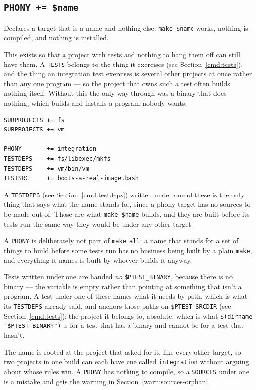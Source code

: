 \documentclass{article}
\begin{document}
\subsection{\texttt{PHONY += \$name} \label{cmd:phony}}

Declares a target that is a name and nothing else: \texttt{make
\$name} works, nothing is compiled, and nothing is installed.

This exists so that a project with tests and nothing to hang them off
can still have them.  A \texttt{TESTS} belongs to the thing it
exercises (see Section~\ref{cmd:tests}), and the thing an integration
test exercises is several other projects at once rather than any one
program --- so the project that owns such a test often builds nothing
itself.  Without this the only way through was a binary that does
nothing, which builds and installs a program nobody wants:

\begin{verbatim}
SUBPROJECTS += fs
SUBPROJECTS += vm

PHONY       += integration
TESTDEPS    += fs/libexec/mkfs
TESTDEPS    += vm/bin/vm
TESTSRC     += boots-a-real-image.bash
\end{verbatim}

A \texttt{TESTDEPS} (see Section~\ref{cmd:testdeps}) written under one
of these is the only thing that says what the name stands for, since a
phony target has no sources to be made out of.  Those are what
\texttt{make \$name} builds, and they are built before its tests run
the same way they would be under any other target.

A \texttt{PHONY} is deliberately not part of \texttt{make all}: a name
that stands for a set of things to build before some tests run has no
business being built by a plain \texttt{make}, and everything it names
is built by whoever builds it anyway.

Tests written under one are handed \textit{no}
\texttt{\$PTEST\_BINARY}, because there is no binary --- the variable
is empty rather than pointing at something that isn't a program.  A
test under one of these names what it needs by path, which is what its
\texttt{TESTDEPS} already said, and anchors those paths on
\texttt{\$PTEST\_SRCDIR} (see Section~\ref{cmd:tests}): the project
it belongs to, absolute, which is what
\texttt{\$(dirname "\$PTEST\_BINARY")} is for a test that has a
binary and cannot be for a test that hasn't.

The name is rooted at the project that asked for it, like every other
target, so two projects in one build can each have one called
\texttt{integration} without arguing about whose rules win.  A
\texttt{PHONY} has nothing to compile, so a \texttt{SOURCES} under one
is a mistake and gets the warning in Section~\ref{warn:sources-orphan}.
\end{document}
